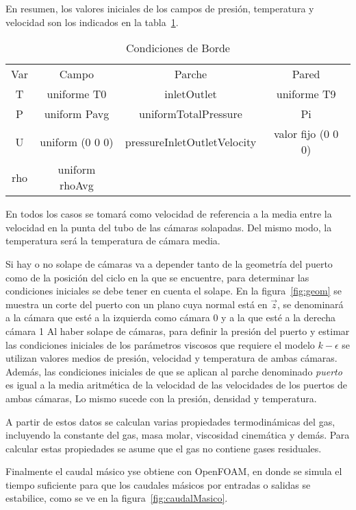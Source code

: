 En resumen, los valores iniciales de los campos de presión, temperatura y velocidad
son los indicados en la tabla~\ref{tab:cc}.

\begin{table}
\centering
    \begin{tabular}{cccc} \toprule
        Var & Campo         & Parche                      & Pared \\
        T   & uniforme T0   & inletOutlet                 & uniforme T9\\ \midrule
        P   & uniform Pavg  & uniformTotalPressure        & Pi \\
        U   & uniform (0 0 0) & pressureInletOutletVelocity & valor fijo (0 0 0)\\
        rho & uniform rhoAvg \\ \bottomrule
    \end{tabular}
    \caption{Condiciones de Borde}\label{tab:cc}
\end{table}

En todos los casos se tomará como velocidad de referencia a la media entre la
velocidad en la punta del tubo de las cámaras solapadas.
%
Del mismo modo, la temperatura será la temperatura de cámara media.

Si hay o no solape de cámaras va a depender tanto de la geometría del puerto
como de la posición del ciclo en la que se encuentre, para determinar las
condiciones iniciales se debe tener en cuenta el solape.
%
En la figura~\ref{fig:geom} se muestra un corte del puerto con un plano cuya
normal está en $\vec{z}$, se denominará a la cámara que esté a la izquierda
como cámara 0 y a la que esté a la derecha cámara 1
%
Al haber solape de cámaras, para definir la presión del puerto y estimar las
condiciones iniciales de los parámetros viscosos que requiere el modelo
$k-\epsilon$ se utilizan valores medios de presión, velocidad y temperatura de
ambas cámaras.
%
Además, las condiciones iniciales de que se aplican al parche denominado
\emph{puerto} es igual a la media aritmética de la velocidad de las velocidades
de los puertos de ambas cámaras, Lo mismo sucede con la presión, densidad y
temperatura.

A partir de estos datos se calculan varias propiedades termodinámicas del gas,
incluyendo la constante del gas, masa molar, viscosidad cinemática y demás.
%
Para calcular estas propiedades se asume que el gas no contiene gases
residuales.

Finalmente el caudal másico yse obtiene con OpenFOAM, en donde se simula el
tiempo suficiente para que los caudales másicos por entradas o salidas se
estabilice, como se ve en la figura~\ref{fig:caudalMasico}.

